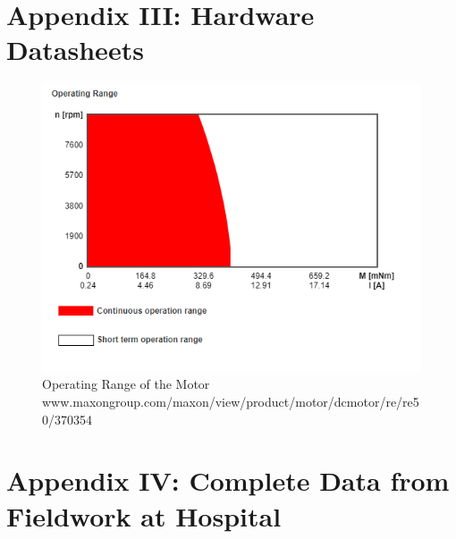 \documentclass[12pt]{report}
\begin{document}
\chapter*{Appendix III: Hardware Datasheets}

	\begin{figure}[h] 
		\centering
		\includegraphics[width=0.75\linewidth]{Motor_range}
		\caption{Operating Range of the Motor \newline \small www.maxongroup.com/maxon/view/product/motor/dcmotor/re/re50/370354}
		\label{fig:motor_range}
	\end{figure}

\chapter*{Appendix IV: Complete Data from Fieldwork at Hospital}


	
	


\end{document}
